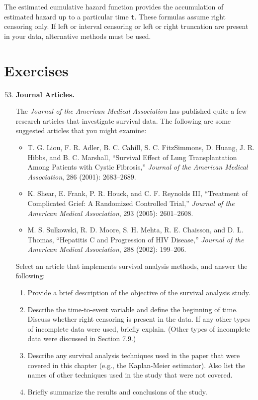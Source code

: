 \documentclass[
]{report}
\begin{document}
The estimated cumulative hazard function provides the accumulation of estimated hazard up to a particular time \texttt{t}. These formulas assume right censoring only. If left or interval censoring or left or right truncation are present in your data, alternative methods must be used.

\hypertarget{exercises-6}{%
\section{Exercises}\label{exercises-6}}

\begin{enumerate}
  \setcounter{enumi}{52}

  \item \textbf{Journal Articles.}

The \textit{Journal of the American Medical Association} has published quite a few research articles that investigate survival data. The following are some suggested articles that you might examine:
\begin{itemize}
  \item T. G. Liou, F. R. Adler, B. C. Cahill, S. C. FitzSimmons, D. Huang, J. R. Hibbs, and B. C. Marshall, ``Survival Effect of Lung Transplantation Among Patients with Cystic Fibrosis,'' \textit{Journal of the American Medical Association}, 286 (2001): 2683–2689.
  \item K. Shear, E. Frank, P. R. Houck, and C. F. Reynolds III, ``Treatment of Complicated Grief: A Randomized Controlled Trial,'' \textit{Journal of the American Medical Association}, 293 (2005): 2601–2608.
  \item M. S. Sulkowski, R. D. Moore, S. H. Mehta, R. E. Chaisson, and D. L. Thomas, ``Hepatitis C and Progression of HIV Disease,'' \textit{Journal of the American Medical Association}, 288 (2002): 199–206.
\end{itemize}

Select an article that implements survival analysis methods, and answer the following:
  \begin{enumerate}
    \item Provide a brief description of the objective of the survival analysis study.
    \item Describe the time-to-event variable and define the beginning of time. Discuss whether right censoring is present in the data. If any other types of incomplete data were used, briefly explain. (Other types of incomplete data were discussed in Section 7.9.)
    \item Describe any survival analysis techniques used in the paper that were covered in this chapter (e.g., the Kaplan-Meier estimator). Also list the names of other techniques used in the study that were not covered.
    \item Briefly summarize the results and conclusions of the study.
  \end{enumerate}


\end{enumerate}
\end{document}
